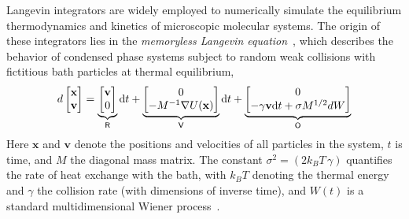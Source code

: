 \documentclass[aip,jcp,preprint,superscriptaddress,floatfix]{revtex4-1}
\newcommand{\x}{\mathbf{x}}
\newcommand{\vel}{\mathbf{v}}
\newcommand{\splitting}[1]{{\bf \sf #1}} %
\newcommand{\dt}{{\differential t}} %
\newcommand{\differential}{\mathrm{d}} %
\begin{document}
Langevin integrators are widely employed to numerically simulate the equilibrium thermodynamics and kinetics of microscopic molecular systems.
The origin of these integrators lies in the \emph{memoryless Langevin equation}~\cite{langevin:1908:langevin-dynamics}, which describes the behavior of condensed phase systems subject to random weak collisions with fictitious bath particles at thermal equilibrium,
\begin{equation}
d \begin{bmatrix} \x\\ \vel \end{bmatrix} =
\underbrace{\begin{bmatrix} \vel \\ 0 \end{bmatrix}}_\splitting{R} \dt +
\underbrace{\begin{bmatrix} 0 \\ - M^{-1} \nabla U(\x) \end{bmatrix}}_\splitting{V} \dt +
\underbrace{\begin{bmatrix} 0 \\ - \gamma \vel \dt + \sigma M^{1/2} d W \end{bmatrix}}_\splitting{O}
\label{equation.LangevinEquation}
\end{equation}
Here $\x$ and $\vel$ denote the positions and velocities of all particles in the system, $t$ is time, and $M$ the diagonal mass matrix. 
The constant $\sigma^2 = (2 k_B T \, \gamma)$ quantifies the rate of heat exchange with the bath, with $k_B T$ denoting the thermal energy and $\gamma$ the collision rate (with dimensions of inverse time), and $W(t)$ is a standard multidimensional Wiener process~\cite{LeimkuhlerMatthewsBook,LelievreBook}.
\end{document}

